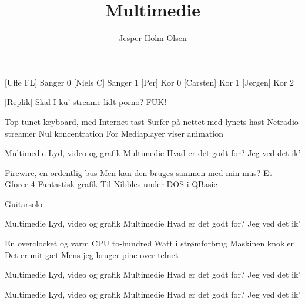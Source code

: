 \documentclass[a4paper,11pt]{article}
\title{Multimedie}
\author{Jesper Holm Olsen}
\begin{document}
\maketitle

\begin{roles} 
  [Uffe FL] Sanger 0
  [Niels C] Sanger 1
  [Per] Kor 0
  [Carsten] Kor 1
  [Jørgen] Kor 2
\end{roles}

\begin{props}
\end{props}

\begin{song}
  
  [Replik] Skal I ku' streame lidt porno? FUK!
  
  Top tunet keyboard, med Internet-tast
  Surfer på nettet med lynets hast
  Netradio streamer
  Nul koncentration
  For Mediaplayer viser animation

  Multimedie
  Lyd, video og grafik 
  Multimedie             
  Hvad er det godt for? Jeg ved det ik'
  
  Firewire, en ordentlig bus
  Men kan den bruges sammen med min mus?
  Et Gforce-4
  Fantastisk grafik
  Til Nibbles under DOS i QBasic
  
  \scene Guitarsolo
  
  Multimedie
  Lyd, video og grafik 
  Multimedie             
  Hvad er det godt for? Jeg ved det ik'
  
  En overclocket og varm CPU
  to-hundred Watt i strømforbrug
  Maskinen knokler
  Det er mit gæt
  Mens jeg bruger pine over telnet
  
  Multimedie
  Lyd, video og grafik 
  Multimedie             
  Hvad er det godt for? Jeg ved det ik'
  
  Multimedie
  Lyd, video og grafik 
  Multimedie             
  Hvad er det godt for? Jeg ved det ik'

\end{song}
\end{document}
